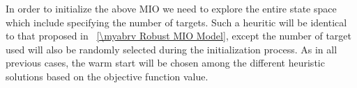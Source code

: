 In order to initialize the above MIO we need to explore the entire state space which include specifying the number of targets. Such a heuritic will be identical to that proposed in \mysection~\ref{\myabrv Robust MIO Model}, except the number of target used will also be randomly  selected during the initialization process. As in all previous cases, the warm start will be chosen among the different heuristic solutions based on the objective function value.